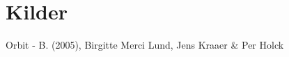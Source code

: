 \section{Kilder}
\begin{thebibliography}{9}

   Orbit - B. (2005), Birgitte Merci Lund, Jens Kraaer \& Per Holck
   

\end{thebibliography}

